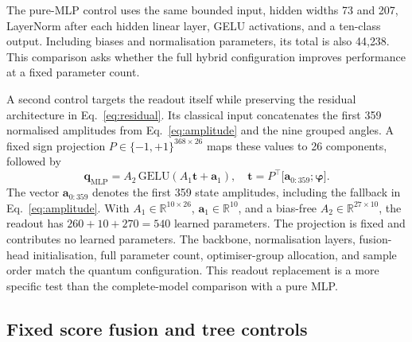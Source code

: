 \documentclass[aps,a4paper,onecolumn,11pt,unpublished]{quantumarticle}
\begin{document}
The pure-MLP control uses the same bounded input, hidden widths 73 and 207, LayerNorm after each hidden linear layer, GELU activations, and a ten-class output. Including biases and normalisation parameters, its total is also 44{,}238. This comparison asks whether the full hybrid configuration improves performance at a fixed parameter count.

A second control targets the readout itself while preserving the residual architecture in Eq.~\eqref{eq:residual}. Its classical input concatenates the first 359 normalised amplitudes from Eq.~\eqref{eq:amplitude} and the nine grouped angles. A fixed sign projection $P\in\{-1,+1\}^{368\times26}$ maps these values to 26 components, followed by
\begin{equation}
\mathbf{q}_{\mathrm{MLP}}=A_2\,\mathrm{GELU}(A_1\mathbf{t}+\mathbf{a}_1),
\quad
\mathbf{t}=P^{\top}\bigl[\mathbf{a}_{0:359};\boldsymbol\varphi\bigr].
\label{eq:matchedreadout}
\end{equation}
The vector $\mathbf{a}_{0:359}$ denotes the first 359 state amplitudes, including the fallback in Eq.~\eqref{eq:amplitude}. With $A_1\in\mathbb{R}^{10\times26}$, $\mathbf{a}_1\in\mathbb{R}^{10}$, and a bias-free $A_2\in\mathbb{R}^{27\times10}$, the readout has $260+10+270=540$ learned parameters. The projection is fixed and contributes no learned parameters. The backbone, normalisation layers, fusion-head initialisation, full parameter count, optimiser-group allocation, and sample order match the quantum configuration. This readout replacement is a more specific test than the complete-model comparison with a pure MLP.

\subsection{Fixed score fusion and tree controls}
\end{document}

